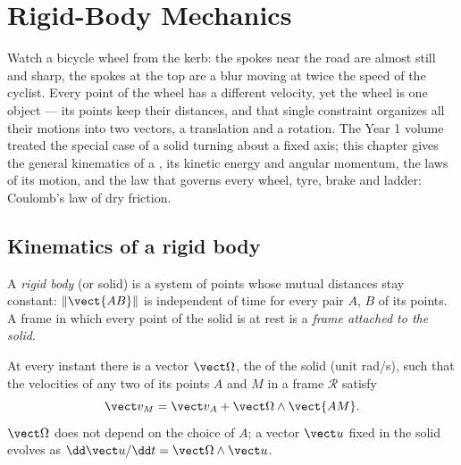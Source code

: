 \chapter{Rigid-Body Mechanics}\label{ch:b2:rigid-body-mechanics}

Watch a bicycle wheel from the kerb: the spokes near the road are almost
still and sharp, the spokes at the top are a blur moving at twice the
speed of the cyclist. Every point of the wheel has a different velocity,
yet the wheel is one object --- its points keep their distances, and that
single constraint organizes all their motions into two vectors, a
translation and a rotation. The Year 1 volume treated the special case
of a solid turning about a fixed axis; this chapter gives the general
kinematics of a , its kinetic energy and angular momentum, the
laws of its motion, and the law that governs every wheel, tyre, brake
and ladder: Coulomb's law of dry friction.

\section{Kinematics of a rigid body}

\begin{definition}\label{def:b2:rigid-body-mechanics:solid}
A \emph{rigid body} (or solid) is a system of points whose mutual
distances stay constant: $\|\vect{AB}\|$ is independent of time for
every pair $A$, $B$ of its points. A frame in which every point of the
solid is at rest is a \emph{frame attached to the solid}.
\end{definition}

\begin{theorem}\label{thm:b2:rigid-body-mechanics:field}
At every instant there is a vector $\vect\Omega$, the \emph{} of the solid (unit \unit{rad/s}), such that the velocities of
any two of its points $A$ and $M$ in a frame $\mathcal R$ satisfy
\[
\vect v_M = \vect v_A + \vect\Omega\wedge\vect{AM} .
\]
$\vect\Omega$ does not depend on the choice of $A$; a vector $\vect u$
fixed in the solid evolves as $\dd\vect u/\dd t = \vect\Omega\wedge\vect u$.
\end{theorem}

